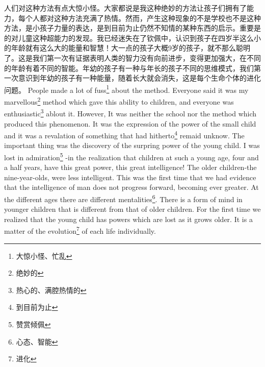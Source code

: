 \documentclass[lang=cn,10pt]{elegantbook}
\begin{document}
\begin{tcolorbox}[title=译文,
colback=red!5!white,
colframe=red!75!black,
fonttitle=\bfseries]
人们对这种方法有点大惊小怪。大家都说是我这种绝妙的方法让孩子们拥有了能力，每个人都对这种方法充满了热情。然而，产生这种现象的不是学校也不是这种方法，是小孩子力量的表达，是到目前为止仍然不知情的某种东西的启示。重要是的对儿童这种超能力的发现。我已经迷失在了钦佩中，认识到孩子在四岁半这么小的年龄就有这么大的能量和智慧！大一点的孩子大概9岁的孩子，就不那么聪明了。这是我们第一次有证据表明人类的智力没有向前进步，变得更加强大，在不同的年龄有着不同的智能。年幼的孩子有一种与年长的孩子不同的思维模式，我们第一次意识到年幼的孩子有一种能量，随着长大就会消失，这是每个生命个体的进化问题。
People made a lot of fuss\footnote{大惊小怪、忙乱} about the method. Everyone said it was my marvellous\footnote{绝妙的} method which gave this ability to children, and everyone was enthusiastic\footnote{热心的、满腔热情的} ablout it. However, It was neither the school nor the method which produced this phenomenon. It was the expression of the power of the small child and it was a revalation of something that had hitherto\footnote{到目前为止} remaid unknow. The important thing was the discovery of the surpring power of the young child. I was lost in admiration\footnote{赞赏倾佩} -in the realization that children at such a young age, four and a half years, have this great power, this great intelligence! The older children-the nine-year-olds, were less intelligent. This was the first time that we had evidence that the intelligence of man does not progress forward, becoming ever greater. At the different ages there are different mentalities\footnote{心态、智能}. There is a form of mind in younger children that is different from that of older children. For the first time we realized that the young child has powers which are lost as it grows older. It is a matter of the evolution\footnote{进化} of each life individually.
\end{tcolorbox}
\end{document}
